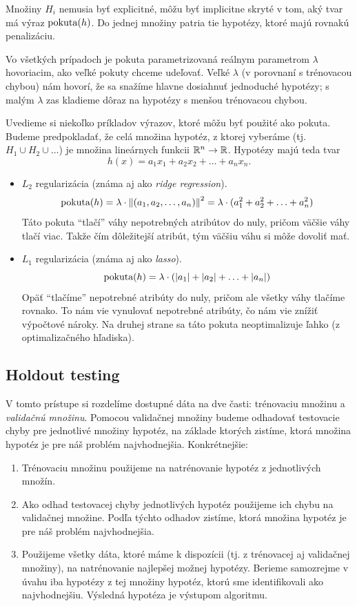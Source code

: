 Množiny $H_i$ nemusia byť explicitné, môžu byť implicitne skryté v tom,
aký tvar má výraz $\text{\normalfont pokuta}(h)$. Do jednej množiny patria tie hypotézy,
ktoré majú rovnakú penalizáciu.

Vo všetkých prípadoch je pokuta parametrizovaná reálnym
parametrom $\lambda$ hovoriacim, ako veľké pokuty chceme udeľovať.
Veľké $\lambda$ (v porovnaní s trénovacou chybou) nám hovorí, že sa
snažíme hlavne dosiahnuť jednoduché hypotézy; s malým $\lambda$ zas
kladieme dôraz na hypotézy s menšou trénovacou chybou.

Uvedieme si niekoľko príkladov výrazov, ktoré môžu byť použité ako
pokuta. Budeme predpokladať, že celá množina hypotéz, z ktorej vyberáme
(tj. $H_1 \cup H_2 \cup \ldots$) je množina lineárnych funkcii
$\mathbb{R}^n \to \mathbb{R}$. Hypotézy majú teda tvar
$$h(x) = a_1x_1 + a_2x_2 + \ldots + a_nx_n.$$
\begin{itemize}
  \item $L_2$ regularizácia (známa aj ako \emph{ridge regression}).
    $$ \text{\normalfont pokuta}(h) = \lambda \cdot \left\lVert(a_1, a_2, \ldots, a_n)\right\rVert^2 = \lambda \cdot (a_1^2 + a_2^2 + \ldots + a_n^2) $$
    Táto pokuta ``tlačí'' váhy nepotrebných atribútov do nuly, pričom
    väčšie váhy tlačí viac. Takže čím dôležitejší atribút, tým väčšiu
    váhu si môže dovoliť mať.
  \item $L_1$ regularizácia (známa aj ako \emph{lasso}).
    $$ \text{\normalfont pokuta}(h) = \lambda \cdot (|a_1| + |a_2| + \ldots + |a_n|) $$
    Opäť ``tlačíme'' nepotrebné atribúty do nuly, pričom ale všetky
    váhy tlačíme rovnako. To nám vie vynulovať nepotrebné atribúty,
    čo nám vie znížiť výpočtové nároky. Na druhej strane sa táto pokuta
    neoptimalizuje ľahko (z optimalizačného hľadiska).
\end{itemize}



\subsection{Holdout testing}

V tomto prístupe si rozdelíme dostupné dáta na dve časti:
trénovaciu množinu a \emph{validačnú množinu}. Pomocou validačnej
množiny budeme odhadovať testovacie chyby pre jednotlivé množiny
hypotéz, na základe ktorých zistíme, ktorá množina hypotéz je
pre náš problém najvhodnejšia. Konkrétnejšie:
\begin{enumerate}
  \item Trénovaciu množinu použijeme na natrénovanie hypotéz
    z jednotlivých množín.
  \item \label{holdout:step2} Ako odhad testovacej chyby jednotlivých
    hypotéz použijeme ich chybu na validačnej množine. Podľa týchto
    odhadov zistíme, ktorá množina hypotéz je pre náš problém najvhodnejšia.
  \item Použijeme všetky dáta, ktoré máme k dispozícii (tj. z trénovacej
    aj validačnej množiny), na natrénovanie najlepšej možnej hypotézy.
    Berieme samozrejme v úvahu iba hypotézy z tej množiny hypotéz, ktorú
    sme identifikovali ako najvhodnejšiu. Výsledná hypotéza je výstupom
    algoritmu.
\end{enumerate}
 
